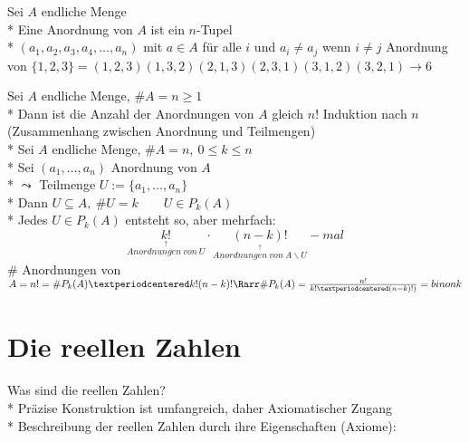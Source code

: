 Sei $A$ endliche Menge\\*
Eine Anordnung von $A$ ist ein $n$-Tupel\\*
$(a_1,a_2,a_3,a_4,…,a_n)$ mit $a\in A$ für alle $i$ und $a_i\neq a_j$ wenn $i\neq j$
%
\bsp
Anordnung von $\{1,2,3\}=(1,2,3)(1,3,2)(2,1,3)(2,3,1)(3,1,2)(3,2,1)→6$

Sei $A$ endliche Menge, $\#A=n\geq 1$\\*
Dann ist die Anzahl der Anordnungen von $A$ gleich $n!$
\bew
Induktion nach $n$
%
\bem
(Zusammenhang zwischen Anordnung und Teilmengen)\\*
Sei $A$ endliche Menge, $\#A=n,\ 0\leq k\leq n$\\*
Sei $(a_1,…,a_n)$ Anordnung von $A$\\*
$\leadsto$ Teilmenge $U:=\{a_1,…,a_n\}$\\*
Dann $U\subseteq A,\ \#U=k\qquad U\in P_k(A)$\\*
Jedes $U\in P_k(A)$ entsteht so, aber mehrfach:
$$\underset{\overset{\uparrow}{Anordnungen\ von\ U}}{k!}·\underset{\overset{\uparrow}{Anordnungen\ von\ A\backslash U}}{(n-k)!}-mal$$
$\#$ Anordnungen von $A=n!=\#P_k(A)·k!(n-k)!\Rarr\#P_k(A)=\frac{n!}{k!·(n-k)!)}=\\bino{n}{k}$

\chapter{Die reellen Zahlen}
Was sind die reellen Zahlen?\\*
Präzise Konstruktion ist umfangreich, daher Axiomatischer Zugang\\*
Beschreibung der reellen Zahlen durch ihre Eigenschaften (Axiome):

